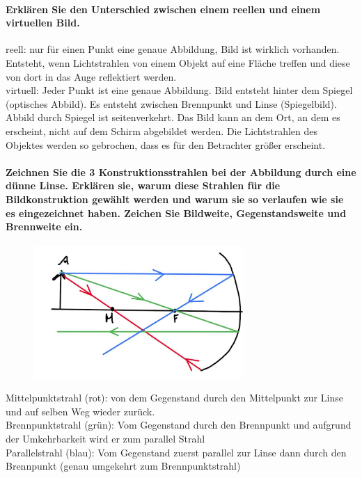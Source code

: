 \documentclass[a4paper, 11pt, ngerman, parskip=half-]{scrartcl}
\begin{document}
\paragraph{Erklären Sie den Unterschied zwischen einem reellen und einem virtuellen Bild.}

reell: nur für einen Punkt eine genaue Abbildung, Bild ist wirklich vorhanden. Entsteht, wenn Lichtstrahlen von einem Objekt auf eine Fläche treffen und diese von dort in das Auge reflektiert werden.\\
virtuell: Jeder Punkt ist eine genaue Abbildung. Bild entsteht hinter dem Spiegel (optisches Abbild). Es entsteht zwischen Brennpunkt und Linse (Spiegelbild).  Abbild durch Spiegel ist seitenverkehrt.  Das Bild kann an dem Ort, an dem es erscheint, nicht auf dem Schirm abgebildet werden. Die Lichtstrahlen des Objektes werden so gebrochen, dass es für den Betrachter größer erscheint.

\paragraph{Zeichnen Sie die 3 Konstruktionsstrahlen bei der Abbildung durch eine dünne Linse.
    Erklären sie, warum diese Strahlen für die Bildkonstruktion gewählt werden und warum sie so
    verlaufen wie sie es eingezeichnet haben. Zeichen Sie Bildweite, Gegenstandsweite und Brennweite
    ein.}

\begin{figure}[H]
    \centering
    \includegraphics[width=8cm]{image/17/geo14}
\end{figure}



Mittelpunktstrahl (rot): von dem Gegenstand durch den Mittelpunkt zur Linse und auf selben Weg wieder zurück.\\
Brennpunktstrahl (grün): Vom Gegenstand durch den Brennpunkt und aufgrund der Umkehrbarkeit wird er zum parallel Strahl\\
Parallelstrahl (blau): Vom Gegenstand zuerst parallel zur Linse dann durch den Brennpunkt (genau umgekehrt zum Brennpunktstrahl)
\end{document}
